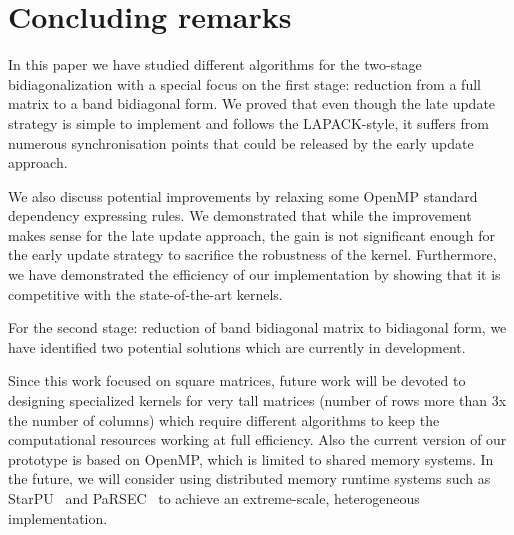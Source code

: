 \section{Concluding remarks}\label{sec:conclusion}
In this paper we have studied different algorithms for
the two-stage bidiagonalization with
a special focus on the first stage:
reduction from a full matrix to a band bidiagonal form.
We proved that even though the late update strategy
is simple to implement and follows the LAPACK-style,
it suffers from numerous synchronisation points that could be
released by the early update approach.

We also discuss potential improvements by relaxing
some OpenMP standard dependency expressing rules.
We demonstrated that while the improvement makes sense for the
late update approach,
the gain is not significant enough for the early update strategy
to sacrifice the robustness of the kernel.
Furthermore,
we have demonstrated the efficiency of our
implementation by showing that it is competitive
with the state-of-the-art kernels.

For the second stage:
reduction of band bidiagonal matrix to bidiagonal form,
we have identified two potential solutions which are
currently in development.

Since this work focused on square matrices,
future work will be devoted to designing specialized kernels
for very tall matrices
(number of rows more than 3x the number of columns)
which require different algorithms to keep the
computational resources working at full efficiency.
Also the current version of our prototype is based on OpenMP,
which is limited to shared memory systems.
In the future,
we will consider using distributed memory runtime
systems such as StarPU~\cite{AugThiNamWac11CCPE} and
PaRSEC~\cite{bosilca2013parsec}
to achieve an extreme-scale, heterogeneous implementation.
